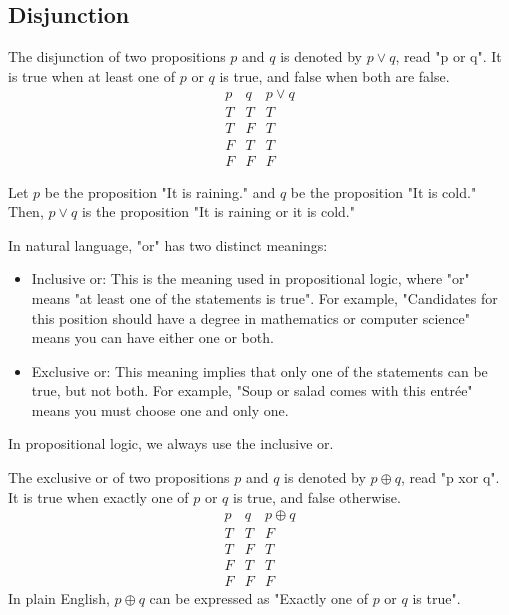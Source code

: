 \subsection{Disjunction}
\begin{definition}[Disjunction]
    The disjunction of two propositions $p$ and $q$ is denoted by $p \lor q$, read "p or q". It is true when at least one of $p$ or $q$ is true, and false when both are false.
    \[
        \begin{array}{c|c|c}
            p & q & p \lor q \\
            \hline
            T & T & T \\
            T & F & T \\
            F & T & T \\
            F & F & F
        \end{array}
    \]
\end{definition}

\begin{eg}
    Let \(p\) be the proposition "It is raining." and \(q\) be the proposition "It is cold." Then, \(p \lor q\) is the proposition "It is raining or it is cold."
\end{eg}
In natural language, "or" has two distinct meanings:
\begin{itemize}[itemsep=1pt,label=$\circ$]
    \item Inclusive or: This is the meaning used in propositional logic, where "or" means "at least one of the statements is true". For example, "Candidates for this position should have a degree in mathematics or computer science" means you can have either one or both.
    \item Exclusive or: This meaning implies that only one of the statements can be true, but not both. For example, "Soup or salad comes with this entrée" means you must choose one and only one.
\end{itemize}
In propositional logic, we always use the inclusive or.

\begin{definition}[XOR]
    The exclusive or of two propositions $p$ and $q$ is denoted by $p \oplus q$, read "p xor q". It is true when exactly one of $p$ or $q$ is true, and false otherwise.
    \[
        \begin{array}{c|c|c}
            p & q & p \oplus q \\
            \hline
            T & T & F \\
            T & F & T \\
            F & T & T \\
            F & F & F
        \end{array}
    \]
    In plain English, $p \oplus q$ can be expressed as "Exactly one of $p$ or $q$ is true".
\end{definition}

